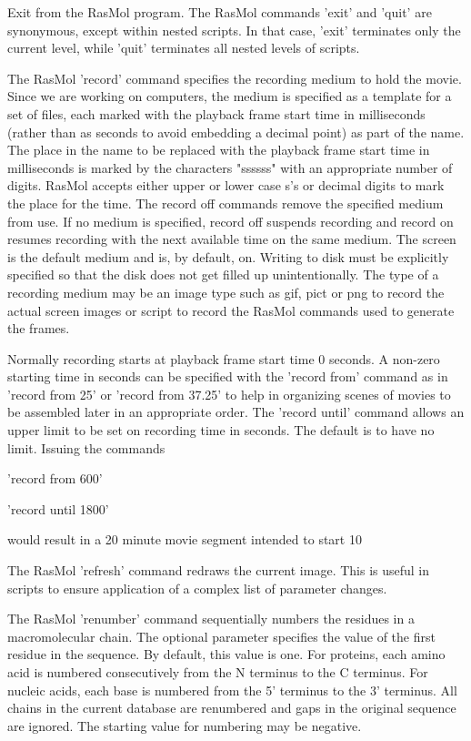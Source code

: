 Exit from the RasMol program. The RasMol commands
'exit'
and
'quit'
are synonymous, except within nested scripts.  In that case,
'exit'
terminates only the current level, while
'quit'
terminates all nested levels of scripts.

The RasMol
'record'
command specifies the recording medium to hold the movie. Since we are
working on computers, the medium is specified as a template for a set of
files, each marked with the playback frame start time in milliseconds
(rather than as seconds to avoid embedding a decimal point) as part of
the name. The place in the name to be replaced with the playback frame
start time in milliseconds is marked by the characters "ssssss" with
an appropriate number of digits. RasMol accepts either upper or lower case
s's or decimal digits to mark the place for the time.  The record off
commands remove the specified medium from use. If no medium is specified,
record off suspends recording and record on resumes recording with the
next available time on the same medium. The screen is the default medium
and is, by default, on. Writing to disk must be explicitly specified so
that the disk does not get filled up unintentionally. The type of a
recording medium may be an image type such as gif, pict or png to record
the actual screen images or script to record the RasMol commands used to
generate the frames.

Normally recording starts at playback frame start time 0 seconds.
A non-zero starting time in seconds can be specified with the
'record from'
command as in
'record from 25'
or
'record from 37.25'
to help in organizing scenes of movies to be assembled later in an
appropriate order.
The
'record until'
command allows an upper limit to be set on recording time in seconds.
The default is to have no limit. Issuing the commands

'record from 600'

'record until 1800'

would result in a 20 minute movie segment intended to start 10

The RasMol
'refresh'
command redraws the current image.  This is useful in scripts
to ensure application of a complex list of parameter changes.

The RasMol
'renumber'
command sequentially numbers the residues in a macromolecular chain.
The optional parameter specifies the value of the first residue in the
sequence. By default, this value is one. For proteins,
each amino acid is numbered consecutively from the N terminus to the C
terminus. For nucleic acids, each base is numbered from the 5' terminus
to the 3' terminus. All chains in the current database are renumbered and gaps
in the original sequence are ignored. The starting value for numbering may
be negative.

